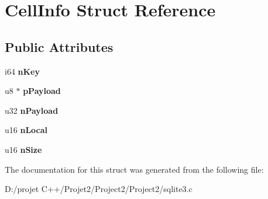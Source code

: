 \hypertarget{struct_cell_info}{}\section{Cell\+Info Struct Reference}
\label{struct_cell_info}
\subsection*{Public Attributes}
\begin{DoxyCompactItemize}
\item 
\mbox{\label{struct_cell_info_a542b041b9a54a13f7c6f2fe63e7542c0}} 
i64 {\bfseries n\+Key}
\item 
\mbox{\label{struct_cell_info_abbcd805bfcc10bed2ff5b81aae466940}} 
u8 $\ast$ {\bfseries p\+Payload}
\item 
\mbox{\label{struct_cell_info_ac1e3c1b4216a8e778bbac82907bb1485}} 
u32 {\bfseries n\+Payload}
\item 
\mbox{\label{struct_cell_info_a8cedbcc2c94916fe5798b502c614bb08}} 
u16 {\bfseries n\+Local}
\item 
\mbox{\label{struct_cell_info_ace78ab5eb5337b686e31b895feeb0562}} 
u16 {\bfseries n\+Size}
\end{DoxyCompactItemize}


The documentation for this struct was generated from the following file\+:\begin{DoxyCompactItemize}
\item 
D\+:/projet C++/\+Projet2/\+Project2/\+Project2/sqlite3.\+c\end{DoxyCompactItemize}
